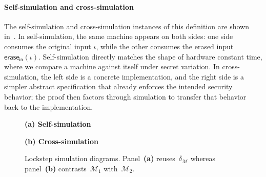 \documentclass[fontset=fira-newtxsf]{mitthesis}
\theoremstyle{definition}
\theoremstyle{plain}
\begin{document}
\paragraph{Self-simulation and cross-simulation}
The self-simulation and cross-simulation instances of this definition are shown in~. In self-simulation, the same machine appears on both sides: one side consumes the original input \(\iota\), while the other consumes the erased input \(\mathsf{erase_{in}}(\iota)\). Self-simulation directly matches the shape of hardware constant time, where we compare a machine against itself under secret variation. In cross-simulation, the left side is a concrete implementation, and the right side is a simpler abstract specification that already enforces the intended security behavior; the proof then factors through simulation to transfer that behavior back to the implementation.

\begin{figure}[H]
\centering
\begin{minipage}[t]{0.49\textwidth}
\centering
\textbf{(a) Self-simulation}\\
\smallskip
{}
\end{minipage}\hfill
\begin{minipage}[t]{0.49\textwidth}
\centering
\textbf{(b) Cross-simulation}\\
\smallskip
{}
\end{minipage}
\caption[Self-simulation and cross-simulation]{Lockstep simulation diagrams. Panel~\textbf{(a)} reuses~\(\delta_{\mathcal{M}}\) whereas panel~\textbf{(b)} contrasts~\(\mathcal{M}_{1}\) with~\(\mathcal{M}_{2}\).}
\label{fig:sim-machines}
\end{figure}
\end{document}
